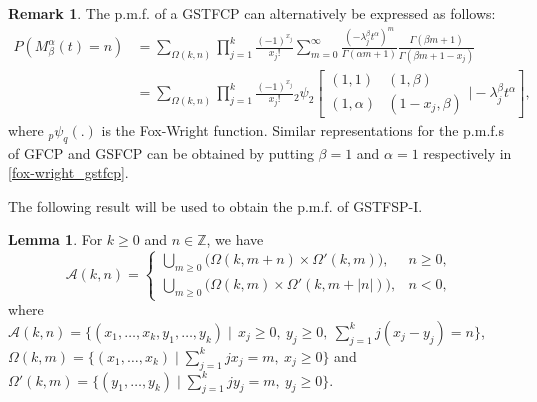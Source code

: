 \documentclass[11pt,oneside,reqno]{amsart}
\theoremstyle{definition}
\newtheorem{remark}{\bf Remark}[section]
\newtheorem{lemma}{Lemma}[section]
\theoremstyle{remarkstyle}
\begin{document}
\begin{remark}
The p.m.f. of a GSTFCP can alternatively be expressed as follows:
\begin{align}\label{fox-wright_gstfcp}
 P(M_{\beta}^{\alpha}(t)=n)
 &=\sum_{\Omega(k,n)}\prod_{j=1}^{k}\frac{(-1)^{x_j}}{x_j!}\sum_{m=0}^{\infty}\frac{(-\lambda_j^\beta t^\alpha)^m}{\Gamma(\alpha m+1)}\frac{\Gamma(\beta m+1)}{\Gamma(\beta m+1-x_j)} \nonumber \\
 &=\sum_{\Omega(k,n)}\prod_{j=1}^{k}\frac{(-1)^{x_j}}{x_j!}{}_2\psi_2\left[\begin{array}{cc}(1,1)&(1,\beta) \\(1,\alpha)&(1-x_j,\beta)\end{array}\bigg|-\lambda_j^\beta t^\alpha\right], 
\end{align}
where ${}_p\psi_q(.)$ is the Fox-Wright function. Similar representations for the p.m.f.s of GFCP and GSFCP can be obtained by putting $\beta=1$ and $\alpha=1$ respectively in \eqref{fox-wright_gstfcp}.
\end{remark}
The following result will be used to obtain the p.m.f. of GSTFSP-I.
\begin{lemma}\label{Omega_set_equality_lemma}
For $k\ge 0$ and $n\in\mathbb{Z}$, we have
\begin{equation*}
\mathcal A(k,n)=
\begin{cases}
\displaystyle\bigcup_{m\ge0}\big(\Omega(k,m+n)\times\Omega'(k,m)\big), & n\ge0,\\
\displaystyle\bigcup_{m\ge0}\big(\Omega(k,m)\times\Omega'(k,m+|n|)\big), & n<0,
\end{cases}
\end{equation*} 
 where $\displaystyle\mathcal{A}(k,n)= \{(x_1,\dots,x_k,y_1,\dots,y_k)\mid\,x_j\ge 0,~y_j\ge 0,~\sum_{j=1}^{k}j(x_j-y_j)=n\}$,\\ $\displaystyle
    \Omega(k,m)= \{(x_1,\dots,x_k)\mid\sum_{j=1}^{k}jx_j=m,~x_j\ge 0\}$
and $\displaystyle\Omega'(k,m)=\{(y_1,\dots,y_k)\mid\sum_{j=1}^{k}jy_j=m,~y_j\ge 0\}$.
\end{lemma}
\end{document}
